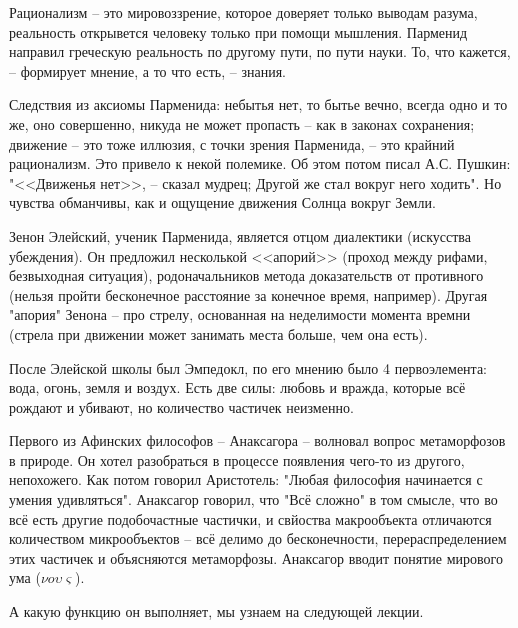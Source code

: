 \documentclass[a4paper, 12pt]{book} %
\begin{document}
Рационализм -- это мировоззрение, которое доверяет только выводам разума, реальность открывется человеку только при помощи мышления. Парменид направил греческую реальность по другому пути, по пути науки. То, что кажется, -- формирует мнение, а то что есть, -- знания.

Следствия из аксиомы Парменида: небытья нет, то бытье вечно, всегда одно и то же, оно совершенно, никуда не может пропасть -- как в законах сохранения; движение -- это тоже иллюзия, с точки зрения Парменида, -- это крайний рационализм. Это привело к некой полемике. Об этом потом писал А.С. Пушкин: "<<Движенья нет>>, -- сказал мудрец; Другой же стал вокруг него ходить". Но чувства обманчивы, как и ощущение движения Солнца вокруг Земли.

Зенон Элейский, ученик Парменида, является отцом диалектики (искусства убеждения). Он предложил несколькой <<апорий>> (проход между рифами, безвыходная ситуация), родоначальников метода доказательств от противного (нельзя пройти бесконечное расстояние за конечное время, например). Другая "апория" Зенона -- про стрелу, основанная на неделимости момента времни (стрела при движении может занимать места больше, чем она есть).

После Элейской школы был Эмпедокл, по его мнению было 4 первоэлемента: вода, огонь, земля и воздух. Есть две силы: любовь и вражда, которые всё рождают и убивают, но количество частичек неизменно.

Первого из Афинских философов -- Анаксагора -- волновал вопрос метаморфозов в природе. Он хотел разобраться в процессе появления чего-то из другого, непохожего. Как потом говорил Аристотель: "Любая философия начинается с умения удивляться". Анаксагор говорил, что "Всё сложно" в том смысле, что во всё есть другие подобочастные частички, и свйоства макрообъекта отличаются количеством микрообъектов -- всё делимо до бесконечности, перераспределением этих частичек и объясняются метаморфозы. Анаксагор вводит понятие мирового ума ($\nu o \upsilon \varsigma $).

 А какую функцию он выполняет, мы узнаем на следующей лекции.
\end{document}
